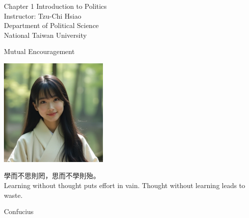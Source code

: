 \documentclass{beamer}
\title{}
\author{}
\date{}
\begin{document}
\begin{frame}
\begin{center}
\Large{Chapter 1 Introduction to Politics} \\
\vspace{3em}
\normalsize{Instructor: Tzu-Chi Hsiao} \\
\vspace{3em}
\small{Department of Political Science} \\
\vspace{1em}
\small{National Taiwan University} \\
\end{center}
\end{frame}
\begin{frame}{Mutual Encouragement}
\begin{center}
\includegraphics[width=0.4\textwidth]{mc.png}
\end{center}
\begin{center}
學而不思則罔，思而不學則殆。 \\
Learning without thought puts effort in vain. Thought without learning leads to waste. 
\end{center}
\flushright Confucius
\end{frame}
\end{document}
